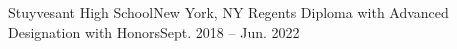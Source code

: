 \resumeSubheading
    {Stuyvesant High School}{New York, NY}
    {Regents Diploma with Advanced Designation with Honors}{Sept. 2018 -- Jun. 2022}